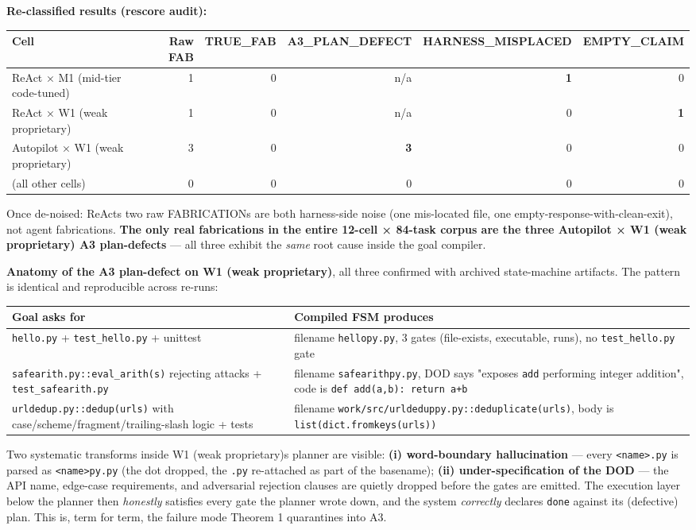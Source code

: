 \textbf{Re-classified results (rescore audit):}

\begin{longtable}[]{@{}lrrrrr@{}}
\toprule\noalign{}
Cell & Raw FAB & TRUE\_FAB & A3\_PLAN\_DEFECT & HARNESS\_MISPLACED & EMPTY\_CLAIM \\
\midrule\noalign{}
\endhead
\bottomrule\noalign{}
\endlastfoot
ReAct × M1 (mid-tier code-tuned) & 1 & 0 & n/a & \textbf{1} & 0 \\
ReAct × W1 (weak proprietary) & 1 & 0 & n/a & 0 & \textbf{1} \\
Autopilot × W1 (weak proprietary) & 3 & 0 & \textbf{3} & 0 & 0 \\
(all other cells) & 0 & 0 & 0 & 0 & 0 \\
\end{longtable}

Once de-noised: ReAct\textquotesingle s two raw FABRICATIONs are both harness-side noise (one mis-located file,
one empty-response-with-clean-exit), not agent fabrications. \textbf{The only real fabrications in the
entire 12-cell × 84-task corpus are the three Autopilot × W1 (weak proprietary) A3 plan-defects} ---
all three exhibit the \emph{same} root cause inside the goal compiler.

\textbf{Anatomy of the A3 plan-defect on W1 (weak proprietary)}, all three confirmed with archived
state-machine artifacts. The pattern is identical and reproducible across re-runs:

\begin{longtable}[]{@{}ll@{}}
\toprule\noalign{}
Goal asks for & Compiled FSM produces \\
\midrule\noalign{}
\endhead
\bottomrule\noalign{}
\endlastfoot
\texttt{hello.py} + \texttt{test\_hello.py} + unittest & filename \texttt{hellopy.py}, 3 gates (file-exists, executable, runs), no \texttt{test\_hello.py} gate \\
\texttt{safearith.py::eval\_arith(s)} rejecting attacks + \texttt{test\_safearith.py} & filename \texttt{safearithpy.py}, DOD says "exposes \texttt{add} performing integer addition", code is \texttt{def\ add(a,b):\ return\ a+b} \\
\texttt{urldedup.py::dedup(urls)} with case/scheme/fragment/trailing-slash logic + tests & filename \texttt{work/src/urldeduppy.py::deduplicate(urls)}, body is \texttt{list(dict.fromkeys(urls))} \\
\end{longtable}

Two systematic transforms inside W1 (weak proprietary)\textquotesingle s planner are visible: \textbf{(i) word-boundary
hallucination} --- every \texttt{\textless{}name\textgreater{}.py} is parsed as \texttt{\textless{}name\textgreater{}py.py} (the dot dropped, the \texttt{.py}
re-attached as part of the basename); \textbf{(ii) under-specification of the DOD} --- the API name,
edge-case requirements, and adversarial rejection clauses are quietly dropped before the gates
are emitted. The execution layer below the planner then \emph{honestly} satisfies every gate the
planner wrote down, and the system \emph{correctly} declares \texttt{done} against its (defective) plan.
This is, term for term, the failure mode Theorem 1 quarantines into A3.

